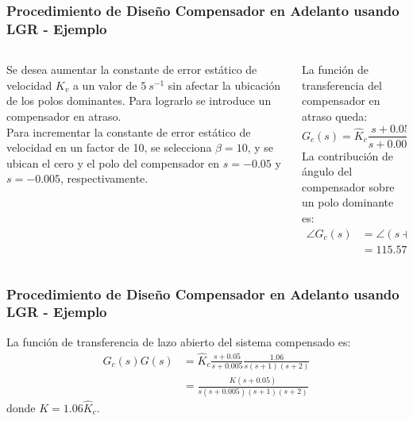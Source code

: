 \documentclass[aspectratio=169,handout]{beamer}
\theoremstyle{definition}
\theoremstyle{plain}
\theoremstyle{remark}
\begin{document}
\begin{frame}[c]\frametitle{Procedimiento de Diseño Compensador en Adelanto usando LGR - Ejemplo}
\begin{columns}
	\begin{column}{0.5\textwidth}
		Se desea aumentar la constante de error estático de velocidad $K_v$ a un valor de $5\ s^{-1}$ sin afectar la ubicación de los polos dominantes. Para lograrlo se introduce un compensador en atraso.\\
		\vspace*{3mm}
		\pause
		Para incrementar la constante de error estático de velocidad en un factor de 10, se selecciona $\beta = 10$, y se ubican el cero y el polo del compensador en $s=-0.05$ y $s=-0.005$, respectivamente.
		\pause
	\end{column}
	\begin{column}{0.5\textwidth}
		La función de transferencia del compensador en atraso queda:
		\begin{equation*}
			G_c(s) = \hat{K}_c \frac{s+0.05}{s+0.005}
		\end{equation*}
		\pause
		La contribución de ángulo del compensador sobre un polo dominante es:
		\begin{align*}
			\angle G_c(s) &= \angle(s+0.05) - \angle(s+0.005)\\
			&= \ang{115.5797} - \ang{119.0488} = -\ang{3.4691}
		\end{align*}
	\end{column}
\end{columns}
\end{frame}

\begin{frame}[c]\frametitle{Procedimiento de Diseño Compensador en Adelanto usando LGR - Ejemplo}
La función de transferencia de lazo abierto del sistema compensado es:
\begin{align*}
	G_c(s)G(s) &= \hat{K}_c \frac{s+0.05}{s+0.005} \frac{1.06}{s(s+1)(s+2)}\\
	&= \frac{K(s+0.05)}{s(s+0.005)(s+1)(s+2)}
\end{align*}
donde $K = 1.06 \hat{K}_c$.
\end{frame}
\end{document}
